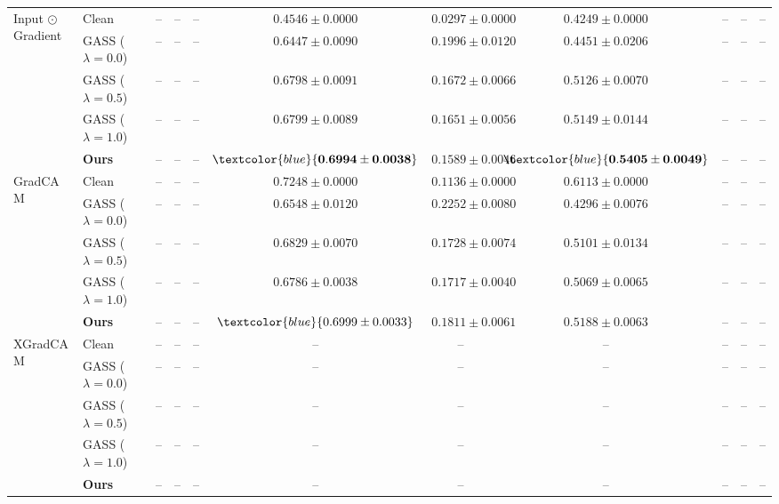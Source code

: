 \begin{table}[t]
{\begin{tabular}{ll|ccc|ccc|ccc}
\multirow{5}{*}{Input $\odot$ Gradient}
& Clean & -- & -- & -- & $0.4546 \pm 0.0000$ & $\mathbf{0.0297 \pm 0.0000}$ & $0.4249 \pm 0.0000$ & -- & -- & -- \\
& GASS ($\lambda=0.0$) & -- & -- & -- & $0.6447 \pm 0.0090$ & $0.1996 \pm 0.0120$ & $0.4451 \pm 0.0206$ & -- & -- & -- \\
& GASS ($\lambda=0.5$) & -- & -- & -- & $0.6798 \pm 0.0091$ & $0.1672 \pm 0.0066$ & $0.5126 \pm 0.0070$ & -- & -- & -- \\
& GASS ($\lambda=1.0$) & -- & -- & -- & $0.6799 \pm 0.0089$ & $0.1651 \pm 0.0056$ & $0.5149 \pm 0.0144$ & -- & -- & -- \\
& \textbf{Ours} & -- & -- & -- & $\textcolor{blue}{\mathbf{0.6994 \pm 0.0038}}$ & $0.1589 \pm 0.0046$ & $\textcolor{blue}{\mathbf{0.5405 \pm 0.0049}}$ & -- & -- & -- \\
\midrule

\multirow{5}{*}{GradCAM}
& Clean & -- & -- & -- & $\mathbf{0.7248 \pm 0.0000}$ & $\mathbf{0.1136 \pm 0.0000}$ & $\mathbf{0.6113 \pm 0.0000}$ & -- & -- & -- \\
& GASS ($\lambda=0.0$) & -- & -- & -- & $0.6548 \pm 0.0120$ & $0.2252 \pm 0.0080$ & $0.4296 \pm 0.0076$ & -- & -- & -- \\
& GASS ($\lambda=0.5$) & -- & -- & -- & $0.6829 \pm 0.0070$ & $0.1728 \pm 0.0074$ & $0.5101 \pm 0.0134$ & -- & -- & -- \\
& GASS ($\lambda=1.0$) & -- & -- & -- & $0.6786 \pm 0.0038$ & $0.1717 \pm 0.0040$ & $0.5069 \pm 0.0065$ & -- & -- & -- \\
& \textbf{Ours} & -- & -- & -- & $\textcolor{blue}{0.6999 \pm 0.0033}$ & $0.1811 \pm 0.0061$ & $0.5188 \pm 0.0063$ & -- & -- & -- \\
\midrule

\multirow{5}{*}{XGradCAM}
& Clean & -- & -- & -- & -- & -- & -- & -- & -- & -- \\
& GASS ($\lambda=0.0$) & -- & -- & -- & -- & -- & -- & -- & -- & -- \\
& GASS ($\lambda=0.5$) & -- & -- & -- & -- & -- & -- & -- & -- & -- \\
& GASS ($\lambda=1.0$) & -- & -- & -- & -- & -- & -- & -- & -- & -- \\
& \textbf{Ours} & -- & -- & -- & -- & -- & -- & -- & -- & -- \\

\bottomrule
\end{tabular}
}

\vspace{0.5cm}


\end{table}
